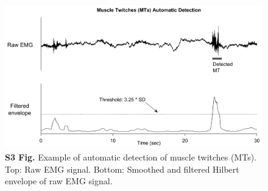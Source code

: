 \begin{figure}[htbp]
	\includegraphics[width=\textwidth]{Fig/Results/Arousals/S3_Fig.png}
	\caption*{\textbf{S3 Fig.} Example of automatic detection of muscle twitches (MTs). Top: Raw EMG signal. Bottom: Smoothed and filtered Hilbert envelope of raw EMG signal. }
\end{figure}

\begin{table}[htb]
    \caption*{\textbf{S1 Table.} Mean ± S.E.M of supplementary macro-structural parameters in High and Low dream recallers, with sleep onset defined as the first page of N1. Last column represents standard values. One-way and two-way ANOVA for independent samples (High-recallers versus Low-recallers) are presented: p<.05*, p<.01**.}
\end{table}
